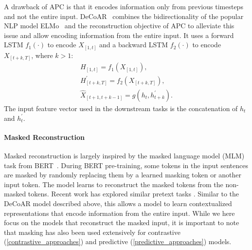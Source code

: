 A drawback of APC is that it encodes information only from previous timesteps
and not the entire input.
DeCoAR~\cite{ling2020deep} combines the bidirectionality of the popular NLP model
ELMo~\cite{peters2018deep} and the reconstruction objective of APC to alleviate
this issue and allow encoding information from the entire input. 
It uses a forward LSTM $f_1(\cdot)$ to encode $X_{[1,t]}$ and a backward LSTM
$f_2(\cdot)$ to encode $X_{[t+k,T]}$, where $k>1$: 
\begin{gather}
    H_{[1,t]} = f_1(X_{[1,t]}), \\
    H^\prime_{[t+k,T]} = f_2(X_{[t+k,T]}), \\
    \hat{X}_{[t+1,t+k-1]} = g(h_t, h^\prime_{t+k}).
\end{gather}
The input feature vector used in the downstream tasks is the concatenation of
$h_{t}$ and $h^\prime_{t}$. 


\paragraph{Masked Reconstruction}

Masked reconstruction is largely inspired by the masked language model (MLM) task from BERT~\cite{jacob2019BERT}. During BERT pre-training, some tokens in the input sentences are masked by randomly replacing them by a learned masking token or another input token. The model learns to reconstruct the masked tokens from the non-masked tokens. Recent work has explored similar pretext tasks . Similar to the DeCoAR model described above, this allows a model to learn contextualized representations that encode information from the entire input. While we here focus on the models that reconstruct the masked input, it is important to note that masking has also been used extensively for contrastive (\cref{contrastive_approaches}) and predictive (\cref{predictive_approaches}) models. 

